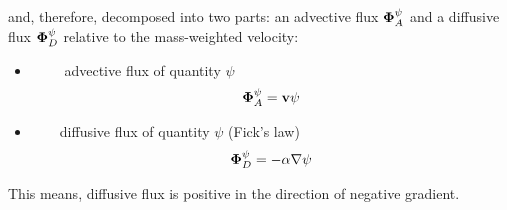 and, therefore, decomposed into two parts: an advective flux
${\bf\Phi}^\psi_A$ and a diffusive flux ${\bf\Phi}^\psi_D$
relative to the mass-weighted velocity:

\begin{itemize}
 \item
$\qquad$ advective flux of quantity $\psi$
\begin{eqnarray}
{\bf\Phi}^\psi_A
=
{\bf v}\psi
\end{eqnarray}

 \item
$\qquad$diffusive flux of quantity $\psi$
(Fick's law)
\begin{eqnarray}
{\bf\Phi}^\psi_D=
-\alpha \nabla\psi
\end{eqnarray}
\end{itemize}

This means, diffusive flux is positive in the direction of negative gradient.
